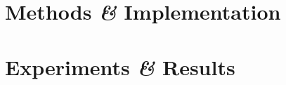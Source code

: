 \documentclass[
  10pt,
  b5paper,
  oneside
]{thesis}
\begin{document}
  
    
  \mainmatter
    

 
    \chapter{Methods \emph{\&} Implementation}
      

    \chapter{Experiments \emph{\&} Results}
      

    
  \backmatter


    
    
\end{document}
